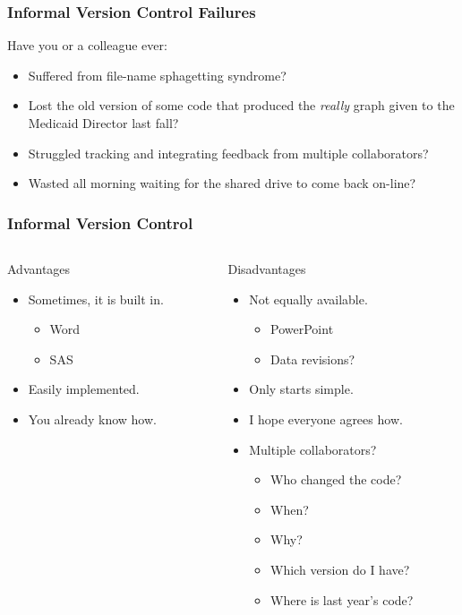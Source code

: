 \documentclass{beamer}
\begin{document}
\begin{frame} 
  \frametitle{Informal Version Control Failures}
  {\large Have you or a colleague ever:}
  \bigskip
  \begin{itemize}
  \item Suffered from file-name sphagetting syndrome?
  \item Lost the old version of some code that produced the \emph{really} graph given
    to the Medicaid Director last fall?
  \item Struggled tracking and integrating feedback from multiple
    collaborators?
  \item Wasted all morning waiting for the shared drive to come back on-line?
  \end{itemize}
\end{frame}

\begin{frame}
  \frametitle{Informal Version Control}
  \begin{columns}[t]
    \begin{column}{.5\textwidth}
      {\large Advantages}
      \begin{itemize}
      \item Sometimes, it is built in.
        \begin{itemize}
        \item Word
        \item SAS
        \end{itemize}
      \item Easily implemented.
      \item You already know how.
      \end{itemize}
    \end{column}
    
    \begin{column}{.5\textwidth}
      {\large Disadvantages}
      \begin{itemize}
      \item Not equally available.
        \begin{itemize}
        \item PowerPoint
        \item Data revisions?
        \end{itemize}
      \item Only starts simple.
      \item I hope everyone agrees how.
      \item Multiple collaborators?
        \begin{itemize}
        \item Who changed the code?
        \item When?  
        \item Why?
        \item Which version do I have?
        \item Where is last year's code?
        \end{itemize}
      \end{itemize}
    \end{column}
  \end{columns}
\end{frame}
\end{document}
